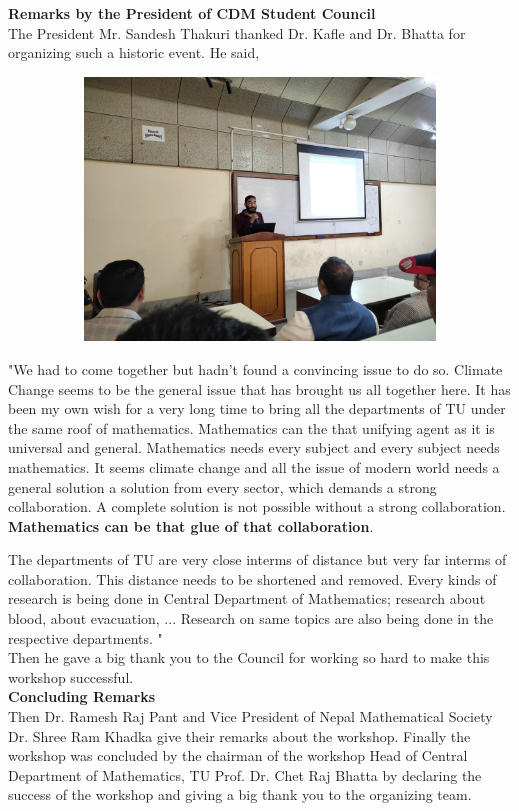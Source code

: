 \documentclass[a4paper,12pt]{report}
\begin{document}
{\bfseries \large Remarks by the President of CDM Student Council}\\
The President Mr. Sandesh Thakuri thanked Dr. Kafle and Dr. Bhatta for organizing such a historic event. He said,
\begin{figure}[h!]
  \centering
  \includegraphics[width=12cm, height=7cm]{president.jpg}
\end{figure}
\vspace{3mm}
"We had to come together but hadn't found a convincing issue to do so. Climate Change seems to be the general issue that has brought us all together here. It has been my own wish for a very long time to bring all the departments of TU under the same roof of mathematics. Mathematics can the that unifying agent as it is universal and general. Mathematics needs every subject and every subject needs mathematics. It seems climate change and all the issue of modern world needs a general solution a solution from every sector, which demands a strong collaboration. A complete solution is not possible without a strong collaboration. \textbf{Mathematics can be that glue of that collaboration}.
\clearpage

The departments of TU are very close interms of distance but very far interms of collaboration. This distance needs to be shortened and removed. Every kinds of research is being done in Central Department of Mathematics; research about blood, about evacuation, ... Research on same topics are also being done in the respective departments.
"\\
Then he gave a big thank you to the Council for working so hard to make this workshop successful.\\[7mm]

{\bfseries \large Concluding Remarks}\\[3mm]
Then Dr. Ramesh Raj Pant and Vice President of Nepal Mathematical Society
Dr. Shree Ram Khadka give their remarks about the workshop. Finally the workshop was concluded by the chairman of the workshop Head of Central Department of Mathematics, TU Prof. Dr. Chet Raj Bhatta by declaring the success of the workshop and giving a big thank you to the organizing team.\\[3mm]
\end{document}
